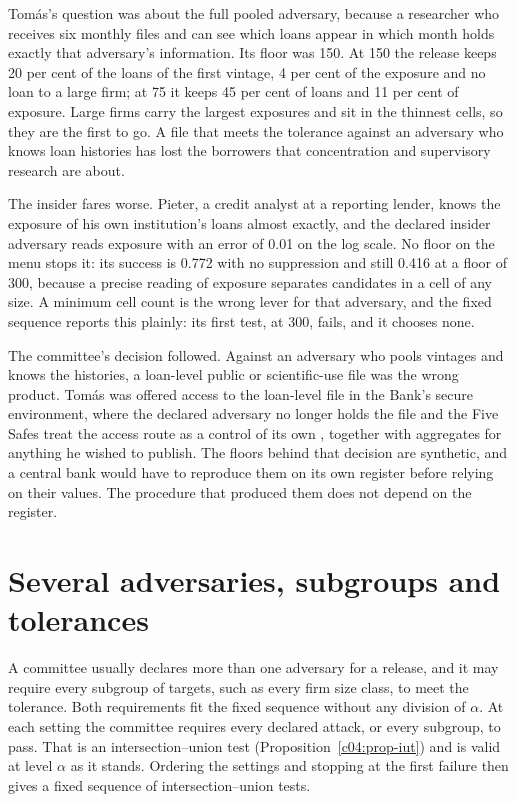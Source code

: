 Tomás's question was about the full pooled adversary, because a researcher who receives
six monthly files and can see which loans appear in which month holds exactly that
adversary's information. Its floor was 150. At 150 the release keeps 20 per cent of the
loans of the first vintage, 4 per cent of the exposure and no loan to a large firm; at
75 it keeps 45 per cent of loans and 11 per cent of exposure.
Large firms carry the largest exposures and sit in the thinnest cells, so they are the
first to go. A file that meets the tolerance against an adversary who knows loan
histories has lost the borrowers that concentration and supervisory research are about.

The insider fares worse. Pieter, a credit analyst at a reporting lender, knows the
exposure of his own institution's loans almost exactly, and the declared insider
adversary reads exposure with an error of 0.01 on the log scale. No floor on the menu
stops it: its success is 0.772 with no suppression and still 0.416 at a floor of 300,
because a precise reading of exposure separates candidates in a cell of any size.
A minimum cell count is the wrong lever for that adversary, and the fixed sequence
reports this plainly: its first test, at 300, fails, and it chooses none.

The committee's decision followed. Against an adversary who pools vintages and knows
the histories, a loan-level public or scientific-use file was the wrong product. Tomás
was offered access to the loan-level file in the Bank's secure environment, where the
declared adversary no longer holds the file and the Five Safes treat the access route as
a control of its own \citep{desai2016}, together with aggregates for anything he wished
to publish. The floors behind that decision are synthetic, and a central bank would have
to reproduce them on its own register before relying on their values. The procedure that
produced them does not depend on the register.

\section{Several adversaries, subgroups and tolerances}

A committee usually declares more than one adversary for a release, and it may require
every subgroup of targets, such as every firm size class, to meet the tolerance. Both
requirements fit the fixed sequence without any division of $\alpha$. At each setting the
committee requires every declared attack, or every subgroup, to pass. That is an
intersection--union test (Proposition~\ref{c04:prop-iut}) and is valid at level $\alpha$
as it stands. Ordering the settings and stopping at the first failure then gives a fixed
sequence of intersection--union tests.

